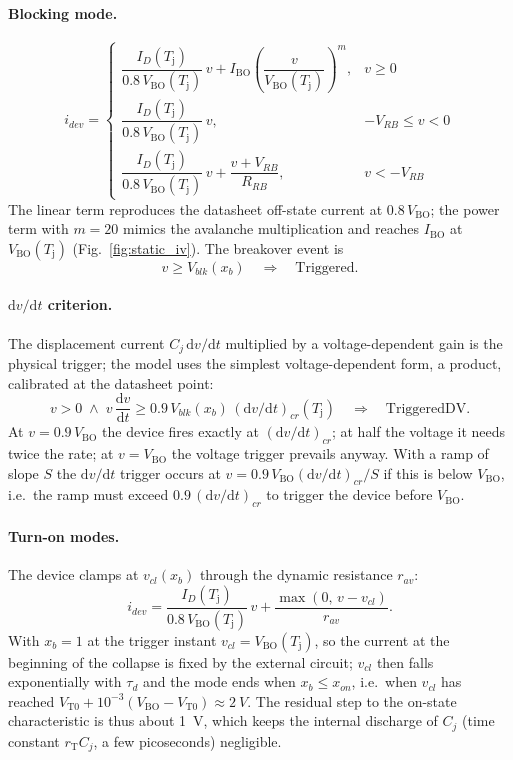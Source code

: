 \documentclass[11pt,a4paper]{article}
\newcommand{\Vbo}{V_{\mathrm{BO}}}
\newcommand{\Ibo}{I_{\mathrm{BO}}}
\newcommand{\Vto}{V_{\mathrm{T0}}}
\newcommand{\rT}{r_{\mathrm{T}}}
\newcommand{\Tj}{T_{\mathrm{j}}}
\newcommand{\dvdt}{\mathrm{d}v/\mathrm{d}t}
\begin{document}
\paragraph{Blocking mode.}
\begin{equation}
i_{dev} =
\begin{cases}
\dfrac{I_D(\Tj)}{0.8\,\Vbo(\Tj)}\, v + \Ibo \left(\dfrac{v}{\Vbo(\Tj)}\right)^{m} , & v \ge 0 \\[10pt]
\dfrac{I_D(\Tj)}{0.8\,\Vbo(\Tj)}\, v , & -V_{RB} \le v < 0 \\[8pt]
\dfrac{I_D(\Tj)}{0.8\,\Vbo(\Tj)}\, v + \dfrac{v + V_{RB}}{R_{RB}} , & v < -V_{RB}
\end{cases}
\label{eq:blocking}
\end{equation}
The linear term reproduces the datasheet off-state current at $0.8\,\Vbo$; the power term with $m=20$ mimics the avalanche multiplication and reaches $\Ibo$ at $\Vbo(\Tj)$ (Fig.~\ref{fig:static_iv}). The breakover event is
\begin{equation}
v \ge V_{blk}(x_b) \quad\Rightarrow\quad \text{Triggered}.
\label{eq:trigger}
\end{equation}

\paragraph{$\dvdt$ criterion.}
\label{sec:dvdt_model}
The displacement current $C_j\,\dvdt$ multiplied by a voltage-dependent gain is the physical trigger; the model uses the simplest voltage-dependent form, a product, calibrated at the datasheet point:
\begin{equation}
v > 0 \;\wedge\; v\,\frac{\mathrm{d}v}{\mathrm{d}t} \ge 0.9\, V_{blk}(x_b)\,(\dvdt)_{cr}(\Tj) \quad\Rightarrow\quad \text{TriggeredDV}.
\label{eq:dvdt}
\end{equation}
At $v = 0.9\,\Vbo$ the device fires exactly at $(\dvdt)_{cr}$; at half the voltage it needs twice the rate; at $v=\Vbo$ the voltage trigger prevails anyway. With a ramp of slope $S$ the $\dvdt$ trigger occurs at $v = 0.9\,\Vbo (\dvdt)_{cr}/S$ if this is below $\Vbo$, i.e.\ the ramp must exceed $0.9\,(\dvdt)_{cr}$ to trigger the device before $\Vbo$.

\paragraph{Turn-on modes.} The device clamps at $v_{cl}(x_b)$ through the dynamic resistance $r_{av}$:
\begin{equation}
i_{dev} = \frac{I_D(\Tj)}{0.8\,\Vbo(\Tj)}\, v + \frac{\max(0,\, v - v_{cl})}{r_{av}} .
\label{eq:triggered}
\end{equation}
With $x_b=1$ at the trigger instant $v_{cl}=\Vbo(\Tj)$, so the current at the beginning of the collapse is fixed by the external circuit; $v_{cl}$ then falls exponentially with $\tau_d$ and the mode ends when $x_b \le x_{on}$, i.e.\ when $v_{cl}$ has reached $\Vto + 10^{-3}(\Vbo - \Vto) \approx \SI{2}{V}$. The residual step to the on-state characteristic is thus about \SI{1}{V}, which keeps the internal discharge of $C_j$ (time constant $\rT C_j$, a few picoseconds) negligible.
\end{document}
